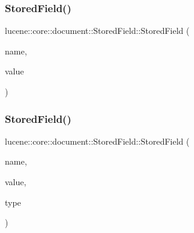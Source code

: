 \mbox{\label{classlucene_1_1core_1_1document_1_1StoredField_a5e25067eaededa0d8e670e23e276dc4d}} 
\subsubsection{\texorpdfstring{Stored\+Field()}{StoredField()}\hspace{0.1cm}{\footnotesize\ttfamily [8/15]}}
{\footnotesize\ttfamily lucene\+::core\+::document\+::\+Stored\+Field\+::\+Stored\+Field (\begin{DoxyParamCaption}\item[{\mbox{\hyperlink{ZlibCrc32_8h_a2c212835823e3c54a8ab6d95c652660e}{const}} std\+::string \&}]{name,  }\item[{\mbox{\hyperlink{ZlibCrc32_8h_a2c212835823e3c54a8ab6d95c652660e}{const}} std\+::string \&}]{value }\end{DoxyParamCaption})\hspace{0.3cm}{\ttfamily [inline]}}

\mbox{\label{classlucene_1_1core_1_1document_1_1StoredField_ac8b65bd52522afed3a0b761dde2d04ca}} 
\subsubsection{\texorpdfstring{Stored\+Field()}{StoredField()}\hspace{0.1cm}{\footnotesize\ttfamily [9/15]}}
{\footnotesize\ttfamily lucene\+::core\+::document\+::\+Stored\+Field\+::\+Stored\+Field (\begin{DoxyParamCaption}\item[{\mbox{\hyperlink{ZlibCrc32_8h_a2c212835823e3c54a8ab6d95c652660e}{const}} std\+::string \&}]{name,  }\item[{std\+::string \&\&}]{value,  }\item[{\mbox{\hyperlink{ZlibCrc32_8h_a2c212835823e3c54a8ab6d95c652660e}{const}} \mbox{\hyperlink{classlucene_1_1core_1_1document_1_1FieldType}{Field\+Type}} \&}]{type }\end{DoxyParamCaption})\hspace{0.3cm}{\ttfamily [inline]}}

